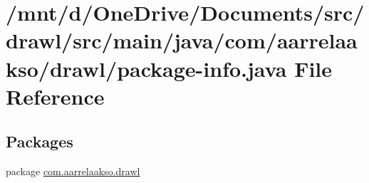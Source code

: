\hypertarget{package-info_8java}{}\section{/mnt/d/\+One\+Drive/\+Documents/src/drawl/src/main/java/com/aarrelaakso/drawl/package-\/info.java File Reference}
\label{package-info_8java}
\subsection*{Packages}
\begin{DoxyCompactItemize}
\item 
package \hyperlink{namespacecom_1_1aarrelaakso_1_1drawl}{com.\+aarrelaakso.\+drawl}
\end{DoxyCompactItemize}
